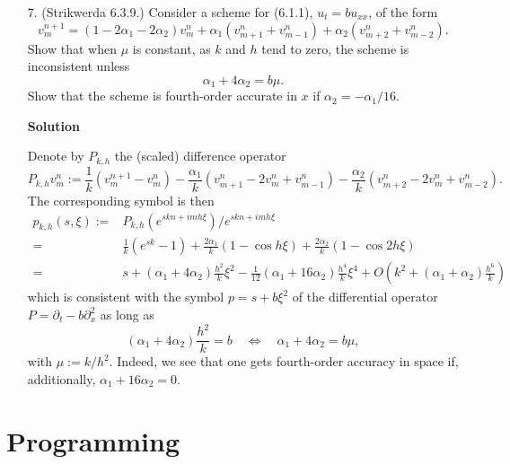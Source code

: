 \documentclass{article}
\begin{document}
\begin{itemize}
\item[7.] (Strikwerda 6.3.9.) Consider a scheme for (6.1.1), $u_t = b u_{xx}$, of the form
\begin{equation*}
v^{n+1}_m = \left( 1 - 2 \alpha_1 - 2 \alpha_2 \right) v^n_m + \alpha_1 \left( v^n_{m+1} + v^n_{m-1} \right) + \alpha_2 \left( v^n_{m+2} + v^n_{m-2} \right).
\end{equation*}
Show that when $\mu$ is constant, as $k$ and $h$ tend to zero, the scheme is inconsistent unless
\begin{equation*}
\alpha_1 + 4 \alpha_2 = b \mu.
\end{equation*}
Show that the scheme is fourth-order accurate in $x$ if $\alpha_2 = -\alpha_1 / 16$.

\textbf{Solution}

Denote by $P_{k,h}$ the (scaled) difference operator
\begin{equation*}
P_{k,h} v^n_m := \frac{1}{k} \left( v^{n+1}_m - v^n_m \right) - \frac{\alpha_1}{k} \left( v^n_{m+1} - 2 v^n_m + v^n_{m-1} \right) - \frac{\alpha_2}{k} \left( v^n_{m+2} - 2 v^n_m + v^n_{m-2} \right).
\end{equation*}
The corresponding symbol is then
\begin{align*}
p_{k,h}(s,\xi) := {} & P_{k,h} \left( e^{skn + imh\xi} \right) / e^{skn + imh\xi} \\
                = {} & \frac{1}{k} \left( e^{sk} - 1 \right) + \frac{2\alpha_1}{k} \left( 1 - \cos h\xi \right) + \frac{2\alpha_2}{k} \left( 1 - \cos 2h\xi \right) \\
                = {} & s + \left( \alpha_1 + 4 \alpha_2 \right) \frac{h^2}{k} \xi^2 - \frac{1}{12} \left( \alpha_1 + 16 \alpha_2 \right) \frac{h^4}{k} \xi^4 +  O \left( k^2 + \left( \alpha_1 + \alpha_2 \right) \frac{h^6}{k} \right)
\end{align*}
which is consistent with the symbol $p = s + b \xi^2$ of the differential operator $P = \partial_t - b \partial_x^2$ as long as
\begin{equation*}
\left( \alpha_1 + 4 \alpha_2 \right) \frac{h^2}{k} = b \quad \Leftrightarrow \quad \alpha_1 + 4 \alpha_2 = b \mu,
\end{equation*}
with $\mu := k/h^2$. Indeed, we see that one gets fourth-order accuracy in space if, additionally, $\alpha_1 + 16 \alpha_2 = 0$.

\end{itemize}

\section{Programming}
\end{document}
